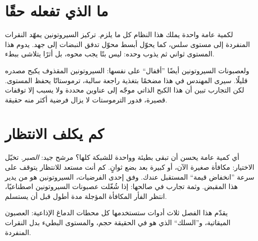 \section*{ما الذي تفعله حقًا}

لكمية عامة واحدة يملك هذا النظام كل ما يلزم. تركيز السيروتونين يمهّد النقرات المنفردة إلى مستوى سلس، كما يحوّل أبسط محوّل تدفق النبضات إلى جهد. يدوم هذا المستوى ثواني ثم يذوب وحده: ليس بتًا يجب محوه، بل أثرًا يتلاشى ببطء.

ولعصبونات السيروتونين أيضًا ”أقفال“ على نفسها: السيروتونين المقذوف يكبح مصدره قليلًا. سيرى المهندس في هذا مضخمًا بتغذية راجعة سالبة، ترموستاتًا يحفظ المستوى. لكن التجارب تبين أن هذا الكبح الذاتي موجّه إلى عناوين محددة ولا يسبب إلا توقفات قصيرة، فدور الترموستات لا يزال فرضية أكثر منه حقيقة.

\section*{كم يكلف الانتظار}

أي كمية عامة يحسن أن تبقى بطيئة وواحدة للشبكة كلها؟ مرشح جيد: \emph{الصبر}. تخيّل الاختيار: مكافأة صغيرة الآن، أو كبيرة بعد بضع ثوانٍ. كم أنت مستعد للانتظار يتوقف على سرعة ”انخفاض قيمة“ المستقبل عندك. وفق إحدى الفرضيات، السيروتونين هو من يدير هذا المقبض. وثمة تجارب في صالحها: إذا شُغّلت عصبونات السيروتونين اصطناعيًا، انتظر الفأر المكافأة المؤجلة مدة أطول قبل أن يستسلم.

يقدّم هذا الفصل ثلاث أدوات ستستخدمها كل محطات الدماغ الإذاعية: العصبون الميقاتية، و”السلك“ الذي هو في الحقيقة حجم، والمستوى البطيء بدل النقرات المنفردة.

